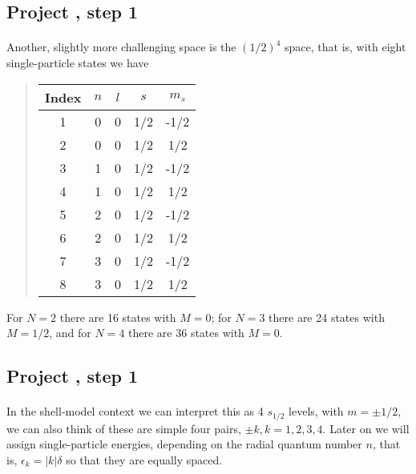 \documentclass[%
twoside,                 %
final,                   %
10pt]{article}
\begin{document}
\subsection{Project , step 1}

\paragraph{}
Another, slightly more challenging space is the $(1/2)^4$ space, that is, 
with eight  single-particle states we have


\begin{quote}
\begin{tabular}{ccccc}
\hline
\multicolumn{1}{c}{ Index } & \multicolumn{1}{c}{ $n$ } & \multicolumn{1}{c}{ $l$ } & \multicolumn{1}{c}{ $s$ } & \multicolumn{1}{c}{ $m_s$ } \\
\hline
1     & 0   & 0   & 1/2 & -1/2  \\
2     & 0   & 0   & 1/2 & 1/2   \\
3     & 1   & 0   & 1/2 & -1/2  \\
4     & 1   & 0   & 1/2 & 1/2   \\
5     & 2   & 0   & 1/2 & -1/2  \\
6     & 2   & 0   & 1/2 & 1/2   \\
7     & 3   & 0   & 1/2 & -1/2  \\
8     & 3   & 0   & 1/2 & 1/2   \\
\hline
\end{tabular}
\end{quote}

\noindent
For $N=2$ there are 16 states with $M=0$; for $N=3$ there are 24 states with $M=1/2$, and for 
$N=4$ there are 36 states with $M=0$.



\subsection{Project , step 1}

\paragraph{}
In the shell-model context we can interpret this as 4 $s_{1/2}$ levels, with $m = \pm 1/2$, we can also think of these are simple four pairs,  $\pm k, k = 1,2,3,4$. Later on we will 
assign single-particle energies,  depending on the radial quantum number $n$, that is, 
$\epsilon_k = |k| \delta$ so that they are equally spaced.
\end{document}
